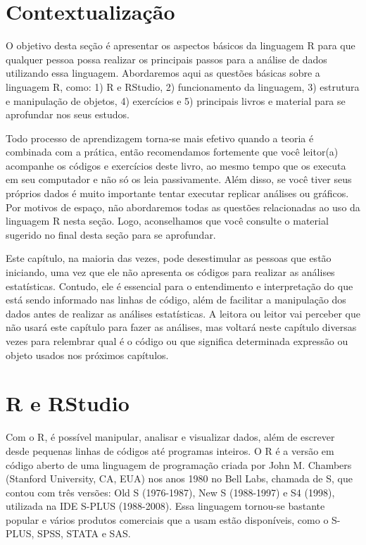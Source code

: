 \documentclass[
]{book}
\begin{document}
\hypertarget{contextualizauxe7uxe3o}{%
\section{Contextualização}\label{contextualizauxe7uxe3o}}

O objetivo desta seção é apresentar os aspectos básicos da linguagem R para que qualquer pessoa possa realizar os principais passos para a análise de dados utilizando essa linguagem. Abordaremos aqui as questões básicas sobre a linguagem R, como: 1) R e RStudio, 2) funcionamento da linguagem, 3) estrutura e manipulação de objetos, 4) exercícios e 5) principais livros e material para se aprofundar nos seus estudos.

Todo processo de aprendizagem torna-se mais efetivo quando a teoria é combinada com a prática, então recomendamos fortemente que você leitor(a) acompanhe os códigos e exercícios deste livro, ao mesmo tempo que os executa em seu computador e não só os leia passivamente. Além disso, se você tiver seus próprios dados é muito importante tentar executar replicar análises ou gráficos. Por motivos de espaço, não abordaremos todas as questões relacionadas ao uso da linguagem R nesta seção. Logo, aconselhamos que você consulte o material sugerido no final desta seção para se aprofundar.

Este capítulo, na maioria das vezes, pode desestimular as pessoas que estão iniciando, uma vez que ele não apresenta os códigos para realizar as análises estatísticas. Contudo, ele é essencial para o entendimento e interpretação do que está sendo informado nas linhas de código, além de facilitar a manipulação dos dados antes de realizar as análises estatísticas. A leitora ou leitor vai perceber que não usará este capítulo para fazer as análises, mas voltará neste capítulo diversas vezes para relembrar qual é o código ou que significa determinada expressão ou objeto usados nos próximos capítulos.

\hypertarget{r-e-rstudio}{%
\section{R e RStudio}\label{r-e-rstudio}}

Com o R, é possível manipular, analisar e visualizar dados, além de escrever desde pequenas linhas de códigos até programas inteiros. O R é a versão em código aberto de uma linguagem de programação criada por John M. Chambers (Stanford University, CA, EUA) nos anos 1980 no Bell Labs, chamada de S, que contou com três versões: Old S (1976-1987), New S (1988-1997) e S4 (1998), utilizada na IDE S-PLUS (1988-2008). Essa linguagem tornou-se bastante popular e vários produtos comerciais que a usam estão disponíveis, como o S-PLUS, SPSS, STATA e SAS.
\end{document}
